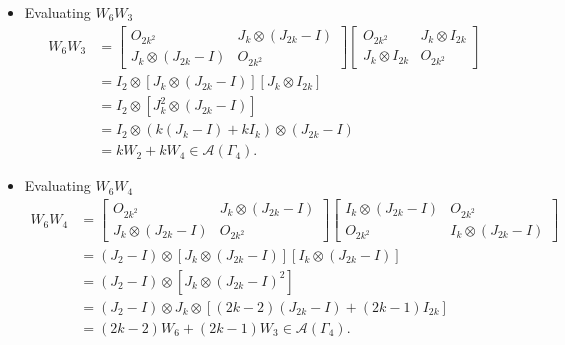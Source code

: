 \begin{itemize}
    \item Evaluating \( W_6 W_3 \)
    \begin{align*}
        W_6W_3
        &=\begin{bmatrix}
            O_{2k^2} & J_k \otimes (J_{2k}-I) \\
            J_k \otimes (J_{2k}-I) & O_{2k^2}
        \end{bmatrix}\begin{bmatrix}
            O_{2k^2} & J_k \otimes I_{2k} \\
            J_k \otimes I_{2k} & O_{2k^2}
        \end{bmatrix}\\
        &= I_2\otimes [J_k \otimes (J_{2k}-I)][J_k \otimes I_{2k}]\\
        &= I_2\otimes [J_k^2\otimes(J_{2k}-I)]\\
        &= I_2\otimes (k(J_k-I) + kI_k)\otimes (J_{2k}-I)\\
        &= kW_2 + kW_4 \in\mathcal{A}(\Gamma_4).
    \end{align*}
    
    \item Evaluating \( W_6 W_4 \)
    \begin{align*}
        W_6W_4
        &=\begin{bmatrix}
            O_{2k^2} & J_k \otimes (J_{2k}-I) \\
            J_k \otimes (J_{2k}-I) & O_{2k^2}
        \end{bmatrix}\begin{bmatrix}
            I_k \otimes (J_{2k} -I) & O_{2k^2}\\
            O_{2k^2} & I_k \otimes (J_{2k} -I)
        \end{bmatrix}\\
        &= (J_2-I)\otimes [J_k \otimes (J_{2k}-I)][I_k \otimes (J_{2k} -I)]\\
        &= (J_2-I)\otimes [J_k \otimes (J_{2k}-I)^2]\\
        &= (J_2-I)\otimes J_k\otimes [(2k-2)(J_{2k}-I) + (2k-1)I_{2k}]\\
        &= (2k-2)W_6 + (2k-1)W_3\in\mathcal{A}(\Gamma_4).
    \end{align*}
    

\end{itemize}

